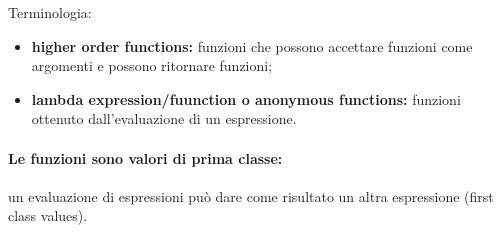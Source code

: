 Terminologia:
\begin{itemize}
  \item \textbf{higher order functions:} funzioni che possono accettare
    funzioni come argomenti e possono ritornare funzioni;
  \item \textbf{lambda expression/fuunction o anonymous functions:} funzioni
    ottenuto dall'evaluazione di un espressione.
\end{itemize}

\paragraph{Le funzioni sono valori di prima classe:}
un evaluazione di espressioni può dare come risultato un altra espressione 
(first class values).
